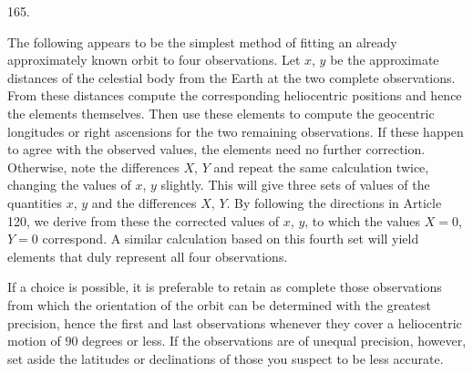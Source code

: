 \begin{center}\hypertarget{native-228-article165}{}165.\end{center}
The following appears to be the simplest method of fitting an already approximately known orbit to four observations. Let $x$, $y$ be the approximate distances of the celestial body from the Earth at the two complete observations. From these distances compute the corresponding heliocentric positions and hence the elements themselves. Then use these elements to compute the geocentric longitudes or right ascensions for the two remaining observations. If these happen to agree with the observed values, the elements need no further correction. Otherwise, note the differences $X$, $Y$ and repeat the same calculation twice, changing the values of $x$, $y$ slightly. This will give three sets of values of the quantities $x$, $y$ and the differences $X$, $Y$. By following the directions in Article 120, we derive from these the corrected values of $x$, $y$, to which the values $X=0$, $Y=0$ correspond. A similar calculation based on this fourth set will yield elements that duly represent all four observations.

If a choice is possible, it is preferable to retain as complete those observations from which the orientation of the orbit can be determined with the greatest precision, hence the first and last observations whenever they cover a heliocentric motion of $90$ degrees or less. If the observations are of unequal precision, however, set aside the latitudes or declinations of those you suspect to be less accurate.

